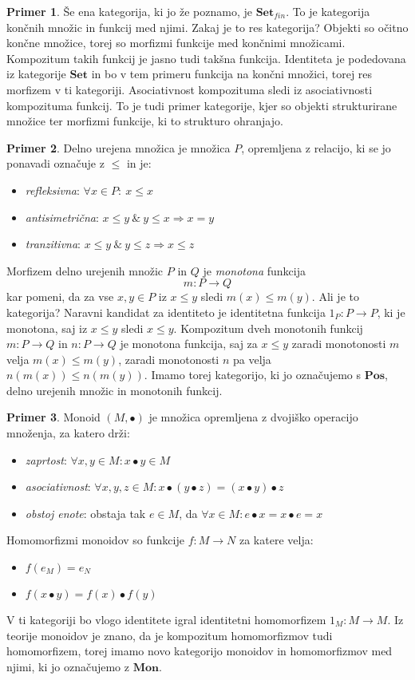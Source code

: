 \documentclass[12pt,a4paper]{book}
\theoremstyle{definition}
\theoremstyle{plain}
\theoremstyle{definition}
\newtheorem{primer}{Primer}[section]
\theoremstyle{remark}
\newcommand{\cat}[1]{\textbf{#1}}
\begin{document}
\begin{primer}
Še ena kategorija, ki jo že poznamo, je $\cat{Set}_{fin}$. To je kategorija končnih množic in funkcij med njimi. Zakaj je to res kategorija? Objekti so očitno končne množice, torej so morfizmi funkcije med končnimi množicami. Kompozitum takih funkcij je jasno tudi takšna funkcija. Identiteta je podedovana iz kategorije $\cat{Set}$ in bo v tem primeru funkcija na končni množici, torej res morfizem v ti kategoriji. Asociativnost kompozituma sledi iz asociativnosti kompozituma funkcij. To je tudi primer kategorije, kjer so objekti strukturirane množice ter morfizmi funkcije, ki to strukturo ohranjajo.
\end{primer}

\begin{primer}
Delno urejena množica je množica $P$, opremljena z relacijo, ki se jo ponavadi označuje z $\leq$ in je:
\begin{itemize}
\item \emph{refleksivna}: $\forall x \in P: \ x \leq x$
\item \emph{antisimetrična}: $x \leq y \ \& \ y \leq x \Rightarrow x = y$
\item \emph{tranzitivna}: $x \leq y \ \& \ y \leq z \Rightarrow x \leq z$
\end{itemize}
Morfizem delno urejenih množic $P$ in $Q$ je \emph{monotona} funkcija
$$m : P \to Q$$
kar pomeni, da za vse $x,y \in P$ iz $x \leq y$ sledi $m(x) \leq m(y)$. Ali je to kategorija? Naravni kandidat za identiteto je identitetna funkcija $1_P : P \to P$, ki je monotona, saj iz $x \leq y$ sledi $x \leq y$.
Kompozitum dveh monotonih funkcij $m : P \to Q$ in $n : P \to Q$ je monotona funkcija, saj za $x \leq y$ zaradi monotonosti $m$ velja $m(x) \leq m(y)$, zaradi monotonosti $n$ pa velja $n(m(x)) \leq n(m(y))$. Imamo torej kategorijo, ki jo označujemo s $\cat{Pos}$, delno urejenih množic in monotonih funkcij.
\end{primer}

\begin{primer}
Monoid $(M, \bullet)$ je množica opremljena z dvojiško operacijo množenja, za katero drži:
\begin{itemize}
\item \emph{zaprtost}: $\forall x,y \in M : x \bullet y \in M$
\item \emph{asociativnost}: $\forall x,y,z \in M : x \bullet ( y \bullet z ) = ( x \bullet y ) \bullet z$
\item \emph{obstoj enote}: obstaja tak $e \in M$, da $\forall x \in M : e \bullet x = x \bullet e = x$
\end{itemize}
Homomorfizmi monoidov so funkcije $f : M \to N$ za katere velja:
\begin{itemize}
\item $f(e_M) = e_N$
\item $f(x \bullet y) = f(x) \bullet f(y)$
\end{itemize}
V ti kategoriji bo vlogo identitete igral identitetni homomorfizem $1_M : M \to M$. Iz teorije monoidov je znano, da je kompozitum homomorfizmov tudi homomorfizem, torej imamo novo kategorijo monoidov in homomorfizmov med njimi, ki jo označujemo z $\cat{Mon}$.
\end{primer}
\end{document}
